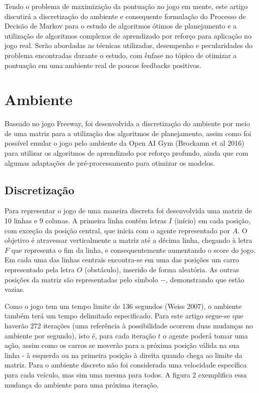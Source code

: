\documentclass[letterpaper]{article} %
\begin{document}
Tendo o problema de maximização da pontuação no jogo em mente, este artigo discutirá a discretização do ambiente e consequente formulação do Processo de Decisão de Markov para o estudo de algoritmos ótimos de planejamento e a utilização de algoritmos complexos de aprendizado por reforço para aplicação no jogo real. Serão abordadas as técnicas utilizadas, desempenho e pecularidades do problema encontradas durante o estudo, com ênfase no tópico de otimizar a pontuação em uma ambiente real de poucos feedbacks positivos.

\section{Ambiente}
Baseado no jogo Freeway, foi desenvolvida a discretização do ambiente por meio de uma matriz para a utilização dos algoritmos de planejamento, assim como foi possível emular o jogo pelo ambiente da Open AI Gym (Brockamn et al 2016) para utilizar os algoritmos de aprendizado por reforço profundo, ainda que com algumas adaptações de pré-processamento para otimizar os modelos.

\subsection{Discretização}
Para representar o jogo de uma maneira discreta foi desenvolvida uma matriz de 10 linhas e 9 colunas. A primeira linha contém letras $I$ (início) em cada posição, com exceção da posição central, que inicia com o agente representado por $A$. O objetivo é atravessar verticalmente a matriz até a décima linha, chegando à letra $F$ que representa o fim da linha, e consequentemente aumentando o score do jogo. Em cada uma das linhas centrais encontra-se em uma das posições um carro representado pela letra $O$ (obstáculo), inserido de forma aleatória. As outras posições da matriz são representadas pelo símbolo $-$, demonstrando que estão vazias. 

Como o jogo tem um tempo limite de 136 segundos (Weiss 2007), o ambiente também terá um tempo delimitado especificado. Para este artigo segue-se que haverão 272 iterações (uma referência à possibilidade ocorrem duas mudanças no ambiente por segundo), isto é, para cada iteração $t$ o agente poderá tomar uma ação, assim como os carros se moverão para a próxima posição válida na sua linha - à esquerda ou na primeira posição à direita quando chega ao limite da matriz. Para o ambiente discreto não foi considerada uma velocidade específica para cada veículo, mas sim uma mesma para todos. A figura 2 exemplifica essa mudança do ambiente para uma próxima iteração.
\end{document}

